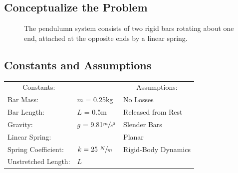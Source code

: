 \documentclass[12pt]{report}
\begin{document}

{\tableofcontents\let\clearpage\relax\listoffigures}
\clearpage
{}
\newpage
\begin{flushleft}
\section{Conceptualize the Problem}

\begin{figure}[h]
  \begin{minipage}[c]{.4\textwidth}
  
\end{minipage}%
\begin{minipage}[c]{.6\textwidth}
  The pendulumn system consists of two rigid bars rotating about one end,
  attached at the opposite ends by a linear spring.
\end{minipage}
\end{figure}

\subsection{Constants and Assumptions}
\begin{tabular}{ll@{\hskip .75in}l}
 \multicolumn{1}{c}{Constants:} && \multicolumn{1}{c}{Assumptions:} \\
 Bar Mass: &$m$ = 0.25kg & No Losses\\
 Bar Length: &$L$ = 0.5m & Released from Rest\\
 Gravity: &$g$ = 9.81$\sfrac{m}{s^2}$ &Slender Bars \\
 Linear Spring: &&Planar\\
 \quad Spring Coefficient:& $k = 25~\sfrac{N}{m}$ &Rigid-Body Dynamics \\
 \quad Unstretched Length:& $L$ \\
\end{tabular}
\vspace{5ex}


\end{flushleft}
\end{document}
